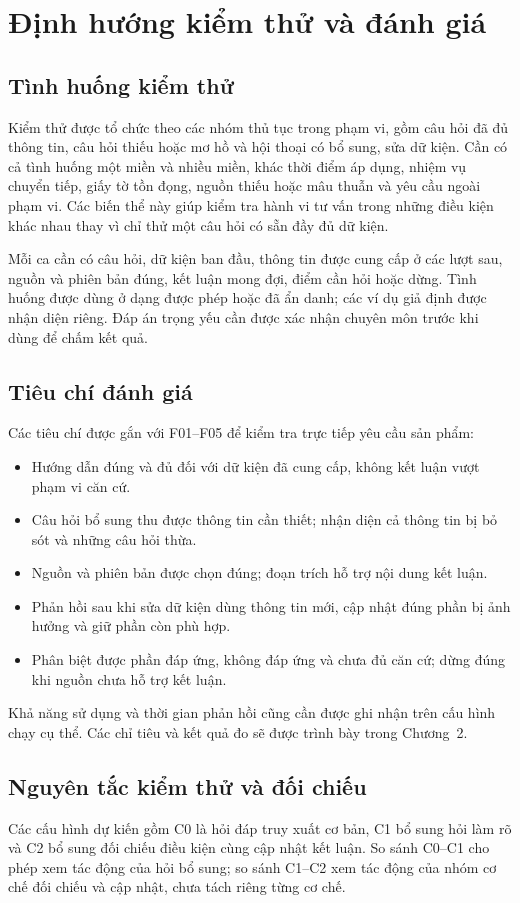 \section{Định hướng kiểm thử và đánh giá}
\label{sec:kiem-chung}
\subsection{Tình huống kiểm thử}
Kiểm thử được tổ chức theo các nhóm thủ tục trong phạm vi, gồm câu hỏi đã
đủ thông tin, câu hỏi thiếu hoặc mơ hồ và hội thoại có bổ sung, sửa dữ kiện.
Cần có cả tình huống một miền và nhiều miền, khác thời điểm áp dụng, nhiệm
vụ chuyển tiếp, giấy tờ tồn đọng, nguồn thiếu hoặc mâu thuẫn và yêu cầu
ngoài phạm vi. Các biến thể này giúp kiểm tra hành vi tư vấn trong những
điều kiện khác nhau thay vì chỉ thử một câu hỏi có sẵn đầy đủ dữ kiện.

Mỗi ca cần có câu hỏi, dữ kiện ban đầu, thông tin được cung cấp ở các lượt
sau, nguồn và phiên bản đúng, kết luận mong đợi, điểm cần hỏi hoặc dừng.
Tình huống được dùng ở dạng được phép hoặc đã ẩn danh; các ví dụ giả định
được nhận diện riêng. Đáp án trọng yếu cần được xác nhận chuyên môn trước
khi dùng để chấm kết quả.

\subsection{Tiêu chí đánh giá}
Các tiêu chí được gắn với F01--F05 để kiểm tra trực tiếp yêu cầu sản phẩm:
\begin{itemize}[leftmargin=*,itemsep=2pt,topsep=3pt]
\item Hướng dẫn đúng và đủ đối với dữ kiện đã cung cấp, không kết luận vượt
 phạm vi căn cứ.
\item Câu hỏi bổ sung thu được thông tin cần thiết; nhận diện cả thông tin
 bị bỏ sót và những câu hỏi thừa.
\item Nguồn và phiên bản được chọn đúng; đoạn trích hỗ trợ nội dung kết luận.
\item Phản hồi sau khi sửa dữ kiện dùng thông tin mới, cập nhật đúng phần
 bị ảnh hưởng và giữ phần còn phù hợp.
\item Phân biệt được phần đáp ứng, không đáp ứng và chưa đủ căn cứ; dừng đúng
 khi nguồn chưa hỗ trợ kết luận.
\end{itemize}
Khả năng sử dụng và thời gian phản hồi cũng cần được ghi nhận trên cấu hình
chạy cụ thể. Các chỉ tiêu và kết quả đo sẽ được trình bày trong Chương~2.

\subsection{Nguyên tắc kiểm thử và đối chiếu}
Các cấu hình dự kiến gồm C0 là hỏi đáp truy xuất cơ bản, C1 bổ sung hỏi làm
rõ và C2 bổ sung đối chiếu điều kiện cùng cập nhật kết luận. So sánh C0--C1
cho phép xem tác động của hỏi bổ sung; so sánh C1--C2 xem tác động của nhóm
cơ chế đối chiếu và cập nhật, chưa tách riêng từng cơ chế.


